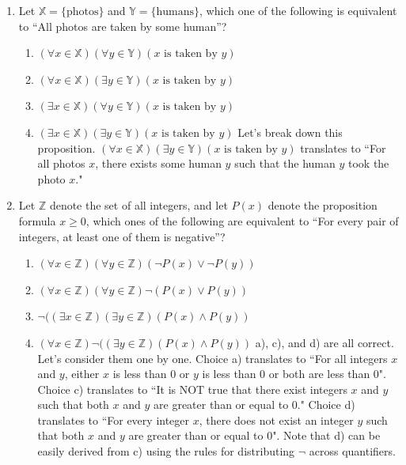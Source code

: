 \documentclass[11pt, preview]{standalone} %
\begin{document}
\begin{enumerate}
\item
Let $\mathbb{X} = \{\text{photos}\}$ and 
$\mathbb{Y} = \{\text{humans}\}$, which one of the 
following is equivalent to 
``All photos are taken by some human''?
\begin{Choices}
  \begin{enumerate}
  \FalseChoice\item $(\forall x \in \mathbb{X})(\forall y \in \mathbb{Y})(x\text{ is taken by }y)$
  \TrueChoice\item $(\forall x \in \mathbb{X})(\exists y \in \mathbb{Y})(x\text{ is taken by }y)$
  \FalseChoice\item $(\exists x \in \mathbb{X})(\forall y \in \mathbb{Y})(x\text{ is taken by }y)$
  \FalseChoice\item $(\exists x \in \mathbb{X})(\exists y \in \mathbb{Y})(x\text{ is taken by }y)$
  \Solution Let's break down this proposition. $(\forall x \in \mathbb{X})(\exists y \in \mathbb{Y})(x \text{ is taken by } y)$ translates to ``For all photos $x$, there exists some human $y$ such that the human $y$ took the photo $x$."
  \end{enumerate}
\end{Choices}


\item
Let $\mathbb{Z}$ denote the set of all integers, and let
$P(x)$ denote the proposition formula $x \geq 0$, which ones of the
following are equivalent to ``For every pair of integers, at least one
of them is negative''?
\begin{Multi}
  \begin{enumerate}
    \TrueChoice\item $(\forall x \in \mathbb{Z})(\forall y \in \mathbb{Z})(\lnot P(x) \lor \lnot P(y))$
    \FalseChoice\item $(\forall x \in \mathbb{Z})(\forall y \in \mathbb{Z})\lnot (P(x) \lor P(y))$
    \TrueChoice\item $\lnot ((\exists x \in \mathbb{Z})(\exists y \in \mathbb{Z})(P(x) \land P(y))$
    \TrueChoice\item $(\forall x \in \mathbb{Z})\lnot ((\exists y \in \mathbb{Z})(P(x) \land P(y))$
    \Solution a), c), and d) are all correct. Let's consider them one by one. Choice a) translates to ``For all integers $x$ and $y$, either $x$ is less than 0 or $y$ is less than 0 or both are less than 0". Choice c) translates to ``It is NOT true that there exist integers $x$ and $y$ such that both $x$ and $y$ are greater than or equal to 0." Choice d) translates to ``For every integer $x$, there does not exist an integer $y$ such that both $x$ and $y$ are greater than or equal to 0". Note that d) can be easily derived from c) using the rules for distributing $\lnot$ across quantifiers. 
  \end{enumerate}
\end{Multi}


\end{enumerate}
\end{document}
